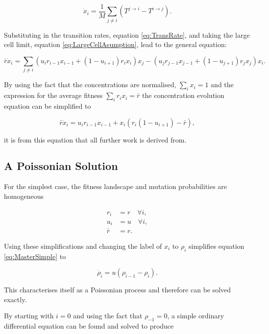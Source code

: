 \documentclass[12pt, a4paper,]{article}
\begin{document}
\begin{equation}
\dot{x} _i = \frac{1}{M} \sum _{j \neq i } \left( T^{j \rightarrow i } - T^{i \rightarrow j}  \right).
\end{equation}

Substituting in the transition rates, equation \eqref{eq:TransRate}, and taking the large cell limit, equation \eqref{eq:LargeCellAsumption}, lead to the general equation: 

\begin{equation}
\bar{r} \dot{x} _i = \sum _{j \neq i} \left( u_i r_{i-1} x_{i-1} + (1 - u_{i+1} ) r_i x_i \right) x_j - \left( u _j r_{j-1} x_{j-1} + (1 - u_{j+1} ) r _j x_j \right) x_i .
\end{equation}

By using the fact that the concentrations are normalised, $\sum _i x_i = 1 $ and the expression for the average fitness $ \sum _i r _i x _i = \bar{r}  $ the concentration evolution equation can be simplified to

\begin{equation}
\bar{r} \dot{x} _i = u_i r_{i-1} x_{i-1} + x _i ( r_i ( 1 - u_{i+1} ) - \bar{r} ),
\label{eq:MasterSimple}
\end{equation}

it is from this equation that all further work is derived from. 

\subsection{A Poissonian Solution}

For the simplest case, the fitness landscape and mutation probabilities are homogeneous

\begin{align}
r_i & = r \quad \forall i, \\
u_i & = u \quad  \forall i, \\
\bar{r} & = r.
\end{align}

Using these simplifications  and changing the label of $x _i$ to $\rho _i$ simplifies equation \eqref{eq:MasterSimple} to

\begin{equation}
\dot{\rho} _i  = u ( \rho _{i-1} - \rho _i ).
\label{eq:PoisMasterSimple}
\end{equation}

This characterises itself as a Poissonian process and therefore can be solved exactly.

By starting with $i=0$ and using the fact that $\rho _{-1} = 0$, a simple ordinary differential equation can be found and solved to produce
\end{document}
